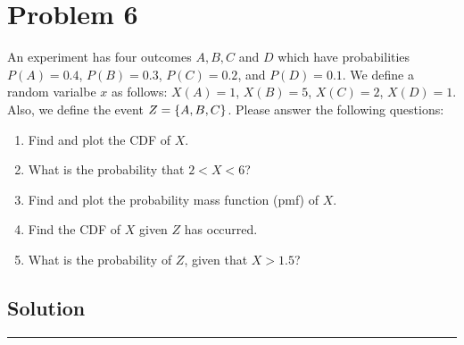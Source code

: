 \section{Problem 6}
An experiment has four outcomes $A, B, C $ and $D$ which have probabilities $P(A)=0.4$, $P(B)=0.3$, $P(C)=0.2$, and $P(D)=0.1$. We define a random varialbe $x$ as follows: $X(A) = 1$, $X(B) = 5$, $X(C) = 2$, $X(D) = 1$. Also, we define the event $Z = \{A, B, C\}$. Please answer the following questions:

\begin{enumerate}[6a.]
	\item Find and plot the CDF of $X$.
	\item What is the probability that $2<X<6$?
	\item Find and plot the probability mass function (pmf) of $X$.
	\item Find the CDF of $X$ given $Z$ has occurred.
	\item What is the probability of $Z$, given that $X>1.5$?
\end{enumerate}
\subsection{Solution}

\noindent\rule{\textwidth}{1pt}